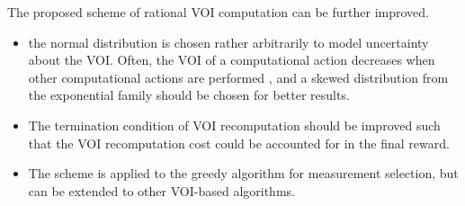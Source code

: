 The proposed scheme of rational VOI computation can be further
improved. 
\begin{itemize}
\item  the normal distribution is chosen rather arbitrarily to model
  uncertainty about the VOI. Often, the VOI of a
  computational action decreases when other computational actions are  
  performed \cite{Guestrin.submodular}, and a skewed distribution from the
  exponential family should be chosen for better results.
\item The termination condition of VOI recomputation should be
  improved such that the VOI recomputation cost could be accounted for
  in the final reward.
\item The scheme is applied to the greedy algorithm
  for measurement selection, but can be extended to other
  VOI-based algorithms.
\end{itemize}
